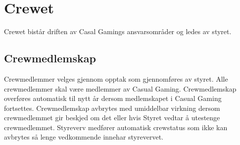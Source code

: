 \chapter{Crewet}
Crewet bistår driften av Casal Gamings ansvarsområder og ledes av styret.

\section{Crewmedlemskap}
Crewmedlemmer velges gjennom opptak som gjennomføres av styret. Alle crewmedlemmer skal være medlemmer av Casual Gaming. Crewmedlemskap overføres automatisk til nytt år dersom medlemskapet i Casual Gaming fortsettes. Crewmedlemskap avbrytes med umiddelbar virkning dersom crewmedlemmet gir beskjed om det eller hvis Styret vedtar å utestenge crewmedlemmet. Styreverv medfører automatisk crewstatus som ikke kan avbrytes så lenge vedkommende innehar styrevervet.
